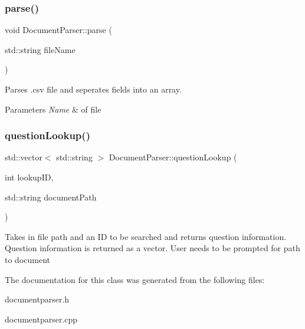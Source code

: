 \subsubsection{\texorpdfstring{parse()}{parse()}}
{\footnotesize\ttfamily void Document\+Parser\+::parse (\begin{DoxyParamCaption}\item[{std\+::string}]{file\+Name }\end{DoxyParamCaption})}



Parses .csv file and seperates fields into an array. 


\begin{DoxyParams}{Parameters}
{\em Name} & of file \\
\hline
\end{DoxyParams}
\mbox{\label{classDocumentParser_a957a602ad41470adfc310f9f16d7c5e7}} 
\subsubsection{\texorpdfstring{question\+Lookup()}{questionLookup()}}
{\footnotesize\ttfamily std\+::vector$<$ std\+::string $>$ Document\+Parser\+::question\+Lookup (\begin{DoxyParamCaption}\item[{int}]{lookup\+ID,  }\item[{std\+::string}]{document\+Path }\end{DoxyParamCaption})}

Takes in file path and an ID to be searched and returns question information. Question information is returned as a vector. User needs to be prompted for path to document 

The documentation for this class was generated from the following files\+:\begin{DoxyCompactItemize}
\item 
documentparser.\+h\item 
documentparser.\+cpp\end{DoxyCompactItemize}
